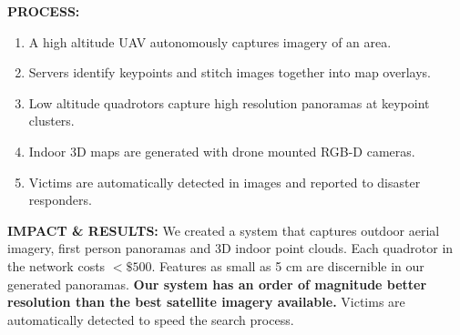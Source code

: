 \noindent\textbf{PROCESS:}
\begin{enumerate}
	\item A high altitude UAV autonomously captures imagery of an area.
	\item Servers identify keypoints and stitch images together into map overlays.
	\item Low altitude quadrotors capture high resolution panoramas at keypoint clusters.
	\item Indoor 3D maps are generated with drone mounted RGB-D cameras.
	\item Victims are automatically detected in images and reported to disaster responders.
\end{enumerate}

%

\noindent\textbf{IMPACT \& RESULTS:} We created a system that captures outdoor aerial imagery, first person panoramas and 3D indoor point clouds. Each quadrotor in the network costs $<\$500$. Features as small as 5 cm are discernible in our generated panoramas. \textbf{Our system has an order of magnitude better resolution than the best satellite imagery available.} Victims are automatically detected to speed the search process.

